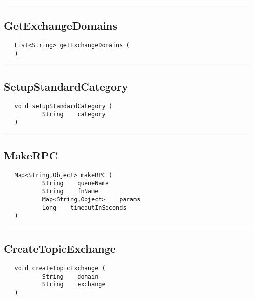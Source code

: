 \rule{15cm}{2pt}
\subsection{GetExchangeDomains}
\label{Api:GetExchangeDomains}
\begin{verbatim}
   List<String> getExchangeDomains (
   )
\end{verbatim}



\rule{15cm}{2pt}
\subsection{SetupStandardCategory}
\label{Api:SetupStandardCategory}
\begin{verbatim}
   void setupStandardCategory (
           String    category
   )
\end{verbatim}



\rule{15cm}{2pt}
\subsection{MakeRPC}
\label{Api:MakeRPC}
\begin{verbatim}
   Map<String,Object> makeRPC (
           String    queueName
           String    fnName
           Map<String,Object>    params
           Long    timeoutInSeconds
   )
\end{verbatim}



\rule{15cm}{2pt}
\subsection{CreateTopicExchange}
\label{Api:CreateTopicExchange}
\begin{verbatim}
   void createTopicExchange (
           String    domain
           String    exchange
   )
\end{verbatim}



